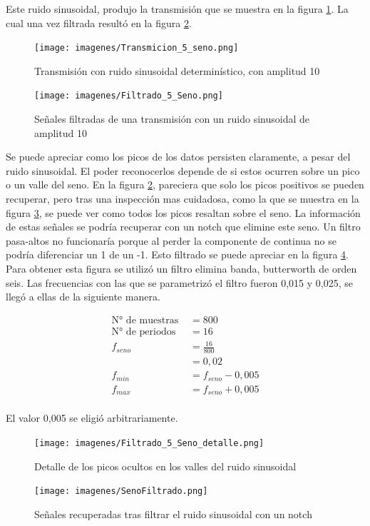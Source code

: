 \documentclass[12pt,letterpaper]{article}     %
\begin{document}
Este ruido sinusoidal, produjo la transmisión que se muestra en la figura \ref{fig:TransSeno}.
La cual una vez filtrada resultó en la figura \ref{fig:FiltSeno}.

\begin{figure}[!ht]
\centering
\texttt{[image: imagenes/Transmicion\_5\_seno.png]}
\caption{Transmisión con ruido sinusoidal determinístico, con amplitud 10}
\label{fig:TransSeno}
\end{figure}

\begin{figure}[!ht]
\centering
\texttt{[image: imagenes/Filtrado\_5\_Seno.png]}
\caption{Señales filtradas de una transmisión con un ruido sinusoidal de amplitud 10}
\label{fig:FiltSeno}
\end{figure}

Se puede apreciar como los picos de los datos persisten claramente, a pesar del ruido
sinusoidal. El poder reconocerlos depende de si estos ocurren sobre un pico o 
un valle del seno. En la figura \ref{fig:FiltSeno}, pareciera que solo los picos positivos
se pueden recuperar, pero tras una inspección mas cuidadosa, como la que se muestra en la
figura \ref{fig:FiltSenoRect}, se puede ver como todos los picos resaltan sobre el seno.
La información de estas señales se podría recuperar con un notch que elimine este seno.
Un filtro pasa-altos no funcionaría porque al perder la componente de continua no se podría 
diferenciar un 1 de un -1. Esto filtrado se puede apreciar en la figura \ref{fig:senoFiltrado}.
Para obtener esta figura se utilizó un filtro elimina banda, butterworth de orden seis.
Las frecuencias con las que se parametrizó el filtro fueron 0,015 y 0,025, se llegó a ellas 
de la siguiente manera.

\begin{equation}
	\begin{split}
		\text{N° de muestras }&=800\\
		\text{N° de periodos }&=16\\
		f_{seno} &=
		\frac{ 16 }{ 800 }\\
		  &= 0,02\\
		f_{min}&=f_{seno}-0,005\\
		f_{max}&=f_{seno}+0,005\\
	\end{split}
\end{equation}

El valor 0,005 se eligió arbitrariamente.

\begin{figure}[!ht]
\centering
\texttt{[image: imagenes/Filtrado\_5\_Seno\_detalle.png]}
\caption{Detalle de los picos ocultos en los valles del ruido sinusoidal}
\label{fig:FiltSenoRect}
\end{figure}

\begin{figure}[!ht]
\centering
\texttt{[image: imagenes/SenoFiltrado.png]}
\caption{Señales recuperadas tras filtrar el ruido sinusoidal con un notch}
\label{fig:senoFiltrado}
\end{figure}
\end{document}
